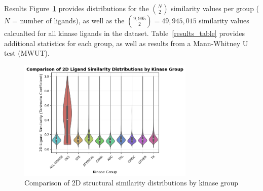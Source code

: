\documentclass[final]{beamer}
\newlength{\colwidth}
\begin{document}
\begin{frame}[t]
\begin{columns}[t]
\begin{column}{\colwidth}
  \begin{block}{Results}
    \small
    Figure~\ref{violin_plot} provides distributions for the ${N\choose 2}$ similarity values per group ($N$ = number of ligands), as well as the ${9,995 \choose 2} = 49,945,015$ similarity values calcualted for all kinase ligands in the dataset. Table~\ref{results_table} provides additional statistics for each group, as well as results from a Mann-Whitney U test (MWUT).
    \begin{figure}
        \centering
        \includegraphics[width=0.75\textwidth]{../figures/violin_plot.png}
        \caption{Comparison of 2D structural similarity distributions by kinase group}
        \label{violin_plot}
    \end{figure}
    

\end{block}
\end{column}
\end{columns}
\end{frame}
\end{document}
